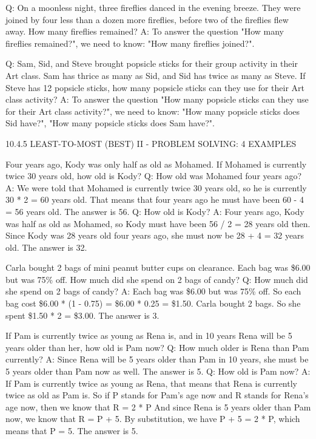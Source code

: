 \documentclass[11pt]{article}
\begin{document}
Q: On a moonless night, three fireflies danced in the evening breeze. They were joined by
four less than a dozen more fireflies, before two of the fireflies flew away. How many fireflies
remained?
A: To answer the question "How many fireflies remained?", we need to know: "How many fireflies
joined?".

Q: Sam, Sid, and Steve brought popsicle sticks for their group activity in their Art class.
Sam has thrice as many as Sid, and Sid has twice as many as Steve. If Steve has 12 popsicle sticks,
how many popsicle sticks can they use for their Art class activity?
A: To answer the question "How many popsicle sticks can they use for their Art class activity?", we
need to know: "How many popsicle sticks does Sid have?", "How many popsicle sticks does Sam
have?".

10.4.5 LEAST-TO-MOST (BEST) II - PROBLEM SOLVING: 4 EXAMPLES

Four years ago, Kody was only half as old as Mohamed. If Mohamed is currently twice 30 years
old, how old is Kody?
Q: How old was Mohamed four years ago?
A: We were told that Mohamed is currently twice 30 years old, so he is currently 30 * 2 = 60 years
old. That means that four years ago he must have been 60 - 4 = 56 years old. The answer is 56.
Q: How old is Kody?
A: Four years ago, Kody was half as old as Mohamed, so Kody must have been 56 / 2 = 28 years
old then. Since Kody was 28 years old four years ago, she must now be 28 + 4 = 32 years old. The
answer is 32.

Carla bought 2 bags of mini peanut butter cups on clearance. Each bag was \$6.00 but was
75\% off. How much did she spend on 2 bags of candy?
Q: How much did she spend on 2 bags of candy?
A: Each bag was \$6.00 but was 75\% off. So each bag cost \$6.00 * (1 - 0.75) = \$6.00 * 0.25 = \$1.50.
Carla bought 2 bags. So she spent \$1.50 * 2 = \$3.00. The answer is 3.

If Pam is currently twice as young as Rena is, and in 10 years Rena will be 5 years older
than her, how old is Pam now?
Q: How much older is Rena than Pam currently?
A: Since Rena will be 5 years older than Pam in 10 years, she must be 5 years older than Pam now
as well. The answer is 5.
Q: How old is Pam now?
A: If Pam is currently twice as young as Rena, that means that Rena is currently twice as old as
Pam is. So if P stands for Pam's age now and R stands for Rena's age now, then we know that R =
2 * P And since Rena is 5 years older than Pam now, we know that R = P + 5. By substitution, we
have P + 5 = 2 * P, which means that P = 5. The answer is 5.
\end{document}
